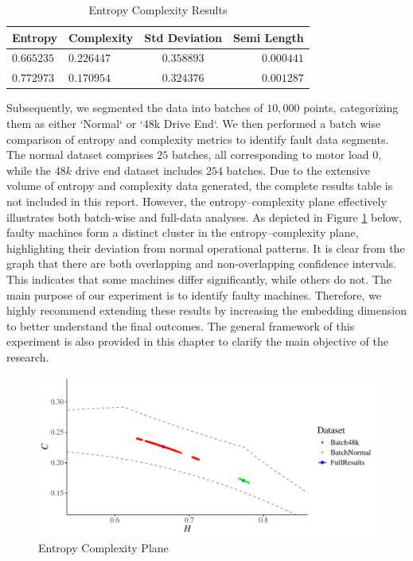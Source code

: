 \begin{table}[H]
	\centering
	\begin{tabular}{llcr}
		\toprule
		Entropy  & Complexity  & Std Deviation & Semi Length \\
		\midrule
	   $0.665235$ & $0.226447$ & $0.358893$ & $0.000441$\\ 
	   $0.772973$ & $0.170954$ & $0.324376$ & $0.001287$\\
		\bottomrule
	\end{tabular}
	\caption{Entropy Complexity Results}
	\label{tab:EnComplexResults}
\end{table}

Subsequently, we segmented the data into batches of $10,000$ points, categorizing them as either `Normal` or `48k Drive End`. We then performed a batch wise comparison of entropy and complexity metrics to identify fault data segments. 
The normal dataset comprises $25$ batches, all corresponding to motor load $0$, while the $48k$ drive end dataset includes $254$ batches. Due to the extensive volume of entropy and complexity data generated, the complete results table is not included in this report. However, the entropy–complexity plane effectively illustrates both batch-wise and full-data analyses. As depicted in Figure \ref{fig:EntopyComplexity Plane} below, faulty machines form a distinct cluster in the entropy–complexity plane, highlighting their deviation from normal operational patterns. 
It is clear from the graph that there are both overlapping and non-overlapping confidence intervals. This indicates that some machines differ significantly, while others do not. The main purpose of our experiment is to identify faulty machines. Therefore, we highly recommend extending these results by increasing the embedding dimension to better understand the final outcomes. The general framework of this experiment is also provided in this chapter to clarify the main objective of the research.

\begin{figure}[hbt]
	\centering
	\includegraphics[width=0.8 \textwidth]{confidence_interval}
	\caption{Entropy Complexity Plane}
	\label{fig:EntopyComplexity Plane}
\end{figure}

